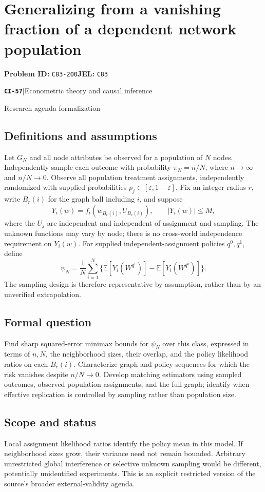 \documentclass[11pt,a4paper]{article}
\newcommand{\E}{\mathbb E}
\newcommand{\entrymeta}[3]{{\sffamily\small\color{muted}\textbf{\texttt{#1}}\quad|\quad #2\par #3\par}}
\begin{document}
\section*{Generalizing from a vanishing fraction of a dependent network population}
\textbf{Problem ID:} \texttt{C83-200}\quad \textbf{JEL:} \texttt{C83}\par
\label{problem:OP-0536}
\label{beyond:CI-57}
\entrymeta{CI-57}{Econometric theory and causal inference}{Research agenda formalization}
\subsection*{Definitions and assumptions}
Let $G_N$ and all node attributes be observed for a population of $N$ nodes. Independently sample each outcome with probability $\pi_N=n/N$, where $n\to\infty$ and $n/N\to0$. Observe all population treatment assignments, independently randomized with supplied probabilities $p_j\in[\varepsilon,1-\varepsilon]$. Fix an integer radius $r$, write $B_r(i)$ for the graph ball including $i$, and suppose
\[
 Y_i(w)=f_i(w_{B_r(i)},U_{B_r(i)}),\qquad |Y_i(w)|\leq M,
\]
where the $U_j$ are independent and independent of assignment and sampling. The unknown functions may vary by node; there is no cross-world independence requirement on $Y_i(w)$. For supplied independent-assignment policies $q^0,q^1$, define
\[
 \psi_N=\frac1N\sum_{i=1}^N
 \{\E[Y_i(W^{q^1})]-\E[Y_i(W^{q^0})]\}.
\]
The sampling design is therefore representative by assumption, rather than by an unverified extrapolation.
\subsection*{Formal question}
Find sharp squared-error minimax bounds for $\psi_N$ over this class, expressed in terms of $n,N$, the neighborhood sizes, their overlap, and the policy likelihood ratios on each $B_r(i)$. Characterize graph and policy sequences for which the risk vanishes despite $n/N\to0$. Develop matching estimators using sampled outcomes, observed population assignments, and the full graph; identify when effective replication is controlled by sampling rather than population size.
\subsection*{Scope and status}
Local assignment likelihood ratios identify the policy mean in this model. If neighborhood sizes grow, their variance need not remain bounded. Arbitrary unrestricted global interference or selective unknown sampling would be different, potentially unidentified experiments. This is an explicit restricted version of the source's broader external-validity agenda.
\end{document}
